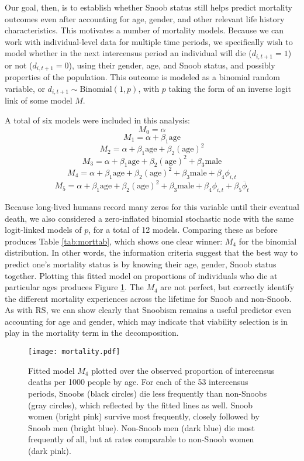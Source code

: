 \documentclass[11pt]{article}
\begin{document}
Our goal, then, is to establish whether Snoob status still helps predict mortality outcomes even after accounting for age, gender, and other relevant life history characteristics.  This motivates a number of mortality models.  Because we can work with individual-level data for multiple time periods, we specifically wish to model whether in the next intercensus period an individual will die ($d_{i,t+1} = 1$) or not ($d_{i,t+1}=0$), using their gender, age, and Snoob status, and possibly properties of the population.  This outcome is modeled as a binomial random variable, or $d_{i,t+1} \sim \mathrm{Binomial}(1,p)$, with $p$ taking the form of an inverse logit link of some model $M$.

A total of six models were included in this analysis:
	\[M_0 = \alpha
\]
	\[M_1 = \alpha + \beta_1 \mathrm{age}
\]
	\[M_2 = \alpha + \beta_1 \mathrm{age} + \beta_2 \mathrm{(age)}^2
\]
	\[M_3 = \alpha + \beta_1 \mathrm{age} + \beta_2 \mathrm{(age)}^2 + \beta_3 \mathrm{male}
\]
	\[M_4 = \alpha + \beta_1 \mathrm{age} + \beta_2 \mathrm{(age)}^2 + \beta_3 \mathrm{male} + \beta_4 \phi_{i,t}
\]
	\[M_5 = \alpha + \beta_1 \mathrm{age} + \beta_2 \mathrm{(age)}^2 + \beta_3 \mathrm{male} + \beta_4 \phi_{i,t} + \beta_5 \overline{\phi}_t
\]

Because long-lived humans record many zeros for this variable until their eventual death, we also considered a zero-inflated binomial stochastic node with the same logit-linked models of $p$, for a total of 12 models.  Comparing these as before produces Table \ref{tab:morttab}, which shows one clear winner: $M_4$ for the binomial distribution.  In other words, the information criteria suggest that the best way to predict one's mortality status is by knowing their age, gender, Snoob status together.  Plotting this fitted model on proportions of individuals who die at particular ages produces Figure \ref{fig:mortality}.  The $M_4$ are not perfect, but correctly identify the different mortality experiences across the lifetime for Snoob and non-Snoob.  As with RS, we can show clearly that Snoobism remains a useful predictor even accounting for age and gender, which may indicate that viability selection is in play in the mortality term in the decomposition.  



\begin{figure}[t]
\begin{center}
\texttt{[image: mortality.pdf]}
\caption{Fitted model $M_{4}$ plotted over the observed proportion of intercensus deaths per 1000 people by age.  For each of the 53 intercensus periods, Snoobs (black circles) die less frequently than non-Snoobs (gray circles), which reflected by the fitted lines as well.  Snoob women (bright pink) survive most frequently, closely followed by Snoob men (bright blue).  Non-Snoob men (dark blue) die most frequently of all, but at rates comparable to non-Snoob women (dark pink).}
\label{fig:mortality}
\end{center}
\end{figure}
\end{document}
